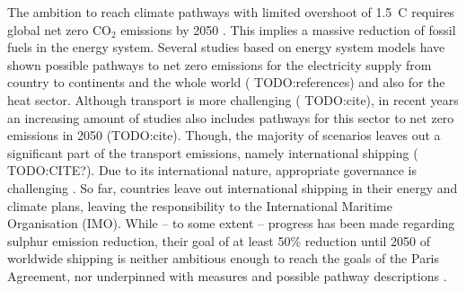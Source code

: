 \documentclass[article]{elsarticle}
\begin{document}
The ambition to reach climate pathways with limited overshoot of 1.5~\degree C requires global net zero CO$_2$ emissions by 2050 \cite{IPCC2018}. This implies a massive reduction of fossil fuels in the energy system. Several studies based on energy system models have shown possible pathways to net zero emissions for the electricity supply from country to continents and the whole world (\cite{Climact2018} TODO:references) and also for the heat sector. Although transport is more challenging (\cite{Salvucci2018,Schafer2012} TODO:cite), in recent years an increasing amount of studies also includes pathways for this sector to net zero emissions in 2050 (TODO:cite). Though, the majority of scenarios leaves out a significant part of the transport emissions, namely international shipping (\cite{TATTINI2018} TODO:CITE?). Due to its international nature, appropriate governance is challenging \cite{GRITSENKO2017}. So far, countries leave out international shipping in their energy and climate plans, leaving the responsibility to the International Maritime Organisation (IMO). While -- to some extent -- progress has been made regarding sulphur emission reduction, their goal of at least 50\% reduction until 2050 of worldwide shipping \cite{IMO2018} is neither ambitious enough to reach the goals of the Paris Agreement, nor underpinned with measures and possible pathway descriptions \cite{Wan2018}.
\end{document}
